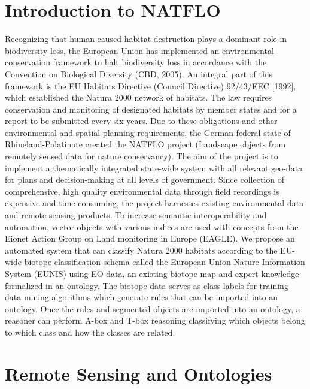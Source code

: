 \documentclass[authoryear, review,12pt,number]{elsarticle}
\begin{document}
\section{Introduction to NATFLO} 
Recognizing that human-caused habitat destruction plays a dominant role in
biodiversity loss, the European Union has implemented an environmental
conservation framework to halt biodiversity loss in accordance with the
Convention on Biological Diversity (CBD, 2005). An integral part of this
framework is the EU Habitats Directive (Council Directive) 92/43/EEC [1992],
which established the Natura 2000 network of habitats. The law requires
conservation and monitoring of designated habitats by member states and for a
report to be submitted every six years. Due to these obligations and other
environmental and spatial planning requirements, the German federal state of
Rhineland-Palatinate created the NATFLO project (Landscape objects from remotely
sensed data for nature conservancy). The aim of the project is to implement a
thematically integrated state-wide system with all relevant geo-data for plans
and decision-making at all levels of government.  Since collection of
comprehensive, high quality environmental data through field recordings is
expensive and time consuming, the project harnesses existing environmental data
and remote sensing products. To increase semantic interoperability and
automation, vector objects with various indices are used with concepts from the
Eionet Action Group on Land monitoring in Europe (EAGLE).
We propose an automated system that can classify Natura 2000 habitats
according to the EU-wide biotope classification schema called the European 
Union Nature Information System (EUNIS) using EO data, an existing biotope map
and expert knowledge formalized in an ontology. The biotope data serves as class
labels for training data mining algorithms which generate rules that can be
imported into an ontology. Once the rules and segmented objects are imported
into an ontology, a reasoner can perform A-box and T-box reasoning classifying
which objects belong to which class and how the classes are related. 


\section{Remote Sensing and Ontologies}
\end{document}
